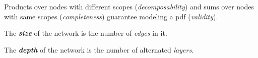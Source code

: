 \documentclass[xcolor={usenames,dvipsnames,svgnames}, compress]{beamer}
\begin{document}
\begin{frame}[t]
\begin{minipage}{0.5\linewidth}

    Products over nodes with different scopes (\emph{decomposability}) and
    sums over nodes with same scopes (\emph{completeness}) guarantee modeling
    a pdf (\emph{validity}).\par\bigskip

    The \emph{\textbf{size}} of the network is the number of \emph{edges} in it.\par\bigskip

    The \emph{\textbf{depth}} of the network is the number of alternated \emph{layers}.\par\bigskip


    

    

  \end{minipage}
\end{frame}
\end{document}
